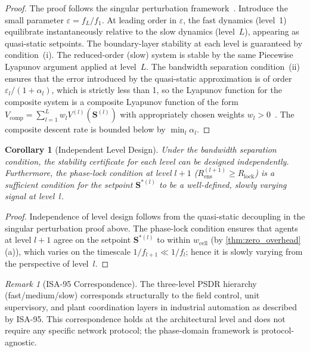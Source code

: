 \documentclass[10pt,twocolumn]{article}
\theoremstyle{plain}
\newtheorem{corollary}[theorem]{Corollary}
\theoremstyle{definition}
\theoremstyle{remark}
\newtheorem{remark}[theorem]{Remark}
\newcommand{\Rlock}{R_{\mathrm{lock}}}
\begin{document}
\begin{proof}
The proof follows the singular perturbation framework~\cite{Khalil2002}.
Introduce the small parameter $\varepsilon = f_{L}/f_1$.  At leading
order in $\varepsilon$, the fast dynamics (level~1) equilibrate
instantaneously relative to the slow dynamics (level~$L$), appearing
as quasi-static setpoints.  The boundary-layer stability at each level
is guaranteed by condition~(i).  The reduced-order (slow) system is
stable by the same Piecewise Lyapunov argument applied at level~$L$.
The bandwidth separation condition~(ii) ensures that the error
introduced by the quasi-static approximation is of order
$\varepsilon_l/(1+\alpha_l)$, which is strictly less than 1, so the
Lyapunov function for the composite system is a composite Lyapunov
function of the form $V_{\mathrm{comp}}
= \sum_{l=1}^L w_l V^{(l)}(\mathbf{S}^{(l)})$
with appropriately chosen weights $w_l >
0$~\cite{Khalil2002}.  The composite descent rate is bounded below by
$\min_l \alpha_l$.
\end{proof}

\begin{corollary}[Independent Level Design]
\label{cor:indep}
Under the bandwidth separation condition, the stability certificate
for each level can be designed independently.  Furthermore, the
phase-lock condition at level $l+1$
($R_{\mathrm{ens}}^{(l+1)} \geq \Rlock$) is a sufficient condition
for the setpoint $\mathbf{S}^{*(l)}$ to be a well-defined, slowly
varying signal at level~$l$.
\end{corollary}

\begin{proof}
Independence of level design follows from the quasi-static decoupling
in the singular perturbation proof above.  The phase-lock condition
ensures that agents at level $l+1$ agree on the setpoint
$\mathbf{S}^{*(l)}$ to within $w_{\mathrm{cell}}$
(by \cref{thm:zero_overhead}(a)), which varies on the timescale
$1/f_{l+1} \ll 1/f_l$; hence it is slowly varying from the perspective
of level~$l$.
\end{proof}

\begin{remark}[ISA-95 Correspondence]
The three-level PSDR hierarchy (fast/medium/slow) corresponds
structurally to the field control, unit supervisory, and plant
coordination layers in industrial automation as described by ISA-95.
This correspondence holds at the architectural level and does not
require any specific network protocol; the phase-domain framework is
protocol-agnostic.
\end{remark}
\end{document}
